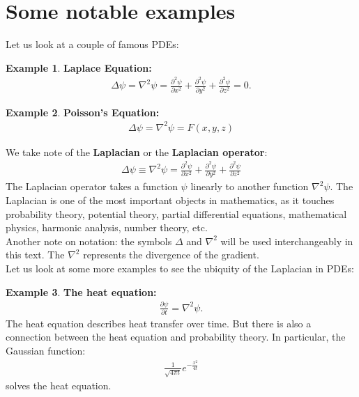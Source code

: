 \documentclass{book}
\theoremstyle{definition}
\newtheorem{exmp}{Example}[section]
\begin{document}
\section{Some notable examples}
Let us look at a couple of famous PDEs:
\begin{exmp}
	\textbf{Laplace Equation:}
	\begin{align*}
	\Delta \psi = \nabla^2\psi = \frac{\partial^2 \psi}{\partial x^2} + \frac{\partial^2 \psi}{\partial y^2} + \frac{\partial^2 \psi}{\partial z^2} = 0.
	\end{align*}
\end{exmp}

\begin{exmp}
	\textbf{Poisson's Equation:}
	\begin{align*}
	\Delta \psi = \nabla^2 \psi = F(x,y,z)
	\end{align*}
\end{exmp}

We take note of the \textbf{Laplacian} or the \textbf{Laplacian operator}:
\begin{align*}
\boxed{\Delta \psi \equiv \nabla^2 \psi = \frac{\partial^2 \psi}{\partial x^2} + \frac{\partial^2 \psi}{\partial y^2} + \frac{\partial^2 \psi}{\partial z^2}}
\end{align*}
The Laplacian operator takes a function $\psi$ linearly to another function $\nabla^2 \psi$. The Laplacian is one of the most important objects in mathematics, as it touches probability theory, potential theory, partial differential equations, mathematical physics, harmonic analysis, number theory, etc.\\

Another note on notation: the symbols $\Delta$ and $\nabla^2$ will be used interchangeably in this text. The $\nabla^2$ represents the divergence of the gradient.\\

Let us look at some more examples to see the ubiquity of the Laplacian in PDEs:
\begin{exmp}
	\textbf{The heat equation:}
	\begin{align*}
	\frac{\partial \psi}{\partial t} = \nabla^2 \psi.
	\end{align*}
	The heat equation describes heat transfer over time. But there is also a connection between the heat equation and probability theory. In particular, the Gaussian function:
	\begin{align*}
	\frac{1}{\sqrt{4\pi t}}e^{-\frac{x^2}{4t}}
	\end{align*}
	solves the heat equation.
\end{exmp}
\end{document}
